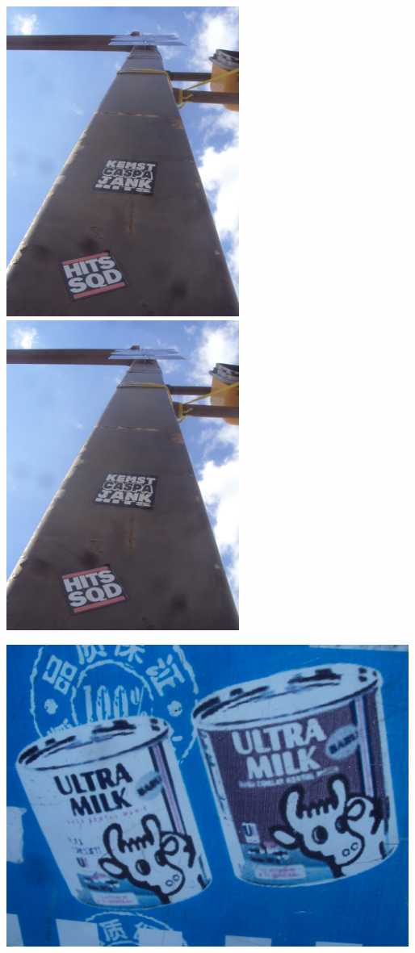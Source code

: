 \documentclass[10pt,letterpaper]{article}
\begin{document}
\pagebreak

\includegraphics[height=4in]{portrait.jpg}
\includegraphics[height=4in]{portrait.jpg}

\vspace{0.25in}
\includegraphics[width=5.19in]{landscape.jpg}
\pagebreak
\end{document}
